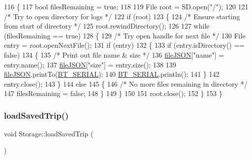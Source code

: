 \begin{DoxyCode}
116 \{
117   \textcolor{keywordtype}{bool} filesRemaining = \textcolor{keyword}{true};
118 
119   File root = SD.open(\textcolor{stringliteral}{"/"});
120 
121   \textcolor{comment}{/* Try to open directory for logs */}
122   \textcolor{keywordflow}{if} (root)
123   \{
124     \textcolor{comment}{/* Ensure starting from start of directory */}
125     root.rewindDirectory();
126 
127     \textcolor{keywordflow}{while} (filesRemaining == \textcolor{keyword}{true})
128     \{
129       \textcolor{comment}{/* Try open handle for next file */}
130       File entry = root.openNextFile();
131       \textcolor{keywordflow}{if} (entry)
132       \{
133         \textcolor{keywordflow}{if} (entry.isDirectory() == \textcolor{keyword}{false})
134         \{
135           \textcolor{comment}{/* Print out file name & size */}
136           \hyperlink{class_logging_device_1_1_storage_a7427821696719fcd52623ff1ea178eb5}{fileJSON}[\textcolor{stringliteral}{"name"}] = entry.name();
137           \hyperlink{class_logging_device_1_1_storage_a7427821696719fcd52623ff1ea178eb5}{fileJSON}[\textcolor{stringliteral}{"size"}] = entry.size();
138 
139           \hyperlink{class_logging_device_1_1_storage_a7427821696719fcd52623ff1ea178eb5}{fileJSON}.printTo(\hyperlink{_storage_8cpp_ad1e6e6f6fc813b305067b9e1b0777ea6}{BT\_SERIAL});
140           \hyperlink{_storage_8cpp_ad1e6e6f6fc813b305067b9e1b0777ea6}{BT\_SERIAL}.println();
141         \}
142         entry.close();
143       \}
144       \textcolor{keywordflow}{else}
145       \{
146         \textcolor{comment}{/* No more files remaining in directory */}
147         filesRemaining = \textcolor{keyword}{false};
148       \}
149     \}
150 
151     root.close();
152   \}
153 \}
\end{DoxyCode}
\mbox{\label{class_logging_device_1_1_storage_af56ca8289ed925300e3385114c561eec}} 
\subsubsection{\texorpdfstring{load\+Saved\+Trip()}{loadSavedTrip()}}
{\footnotesize\ttfamily void Storage\+::load\+Saved\+Trip (\begin{DoxyParamCaption}{ }\end{DoxyParamCaption})}



